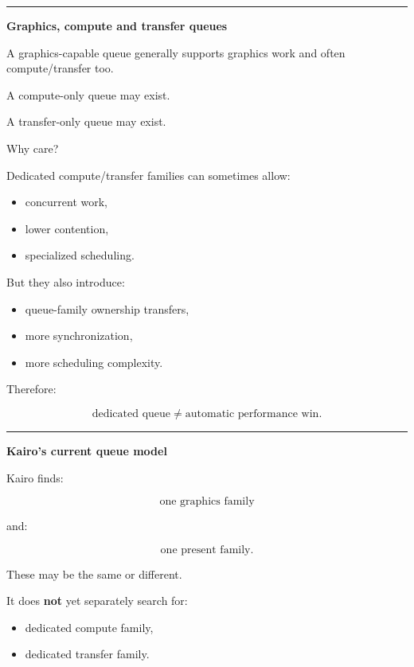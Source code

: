 \begin{center}\rule{0.5\linewidth}{0.5pt}\end{center}

\textbf{Graphics, compute and transfer queues}

A graphics-capable queue generally supports graphics work and often compute/transfer too.

A compute-only queue may exist.

A transfer-only queue may exist.

Why care?

Dedicated compute/transfer families can sometimes allow:

\begin{itemize}
\tightlist
\item
  concurrent work,
\item
  lower contention,
\item
  specialized scheduling.
\end{itemize}

But they also introduce:

\begin{itemize}
\tightlist
\item
  queue-family ownership transfers,
\item
  more synchronization,
\item
  more scheduling complexity.
\end{itemize}

Therefore:

\[
\boxed{
\text{dedicated queue}
\neq
\text{automatic performance win}.
}
\]

\begin{center}\rule{0.5\linewidth}{0.5pt}\end{center}

\textbf{Kairo's current queue model}

Kairo finds:

\[
\boxed{
\text{one graphics family}
}
\]

and:

\[
\boxed{
\text{one present family}.
}
\]

These may be the same or different.

It does \textbf{not} yet separately search for:

\begin{itemize}
\tightlist
\item
  dedicated compute family,
\item
  dedicated transfer family.
\end{itemize}

